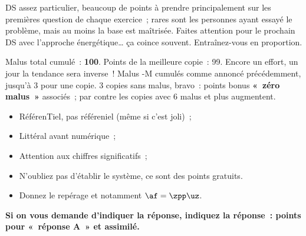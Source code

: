 \documentclass[a4paper, 10pt, final, garamond]{book}
\begin{document}
DS assez particulier, beaucoup de points à prendre principalement sur les
premières question de chaque exercice~; rares sont les personnes ayant essayé le
problème, mais au moins la base est maîtrisée. Faites attention pour le prochain
DS avec l'approche énergétique… ça coince souvent. Entraînez-vous en proportion.
\bigbreak

Malus total cumulé~: \textbf{100}. Points de la meilleure copie~: 99. Encore un
effort, un jour la tendance sera inverse~! Malus -M cumulés comme annoncé
précédemment, jusqu'à 3 pour une copie. 3 copies sans malus, bravo~: points
bonus \textbf{«~zéro malus~»} associés~; par contre les copies avec 6 malus et
plus augmentent. \bigbreak

\begin{itemize}
    \item RéférenTiel, pas référeniel (même si c'est joli)~;
    \item Littéral avant numérique~;
    \item Attention aux chiffres significatifs~;
    \item N'oubliez pas d'établir le système, ce sont des points gratuits.
    \item Donnez le repérage et notamment $\af = \zpp\uz$.
\end{itemize}

\begin{framed}
    \centering\large\bfseries
    Si on vous demande d'indiquer la réponse, indiquez la réponse~: points pour
    «~réponse A~» et assimilé.
\end{framed}
\end{document}
